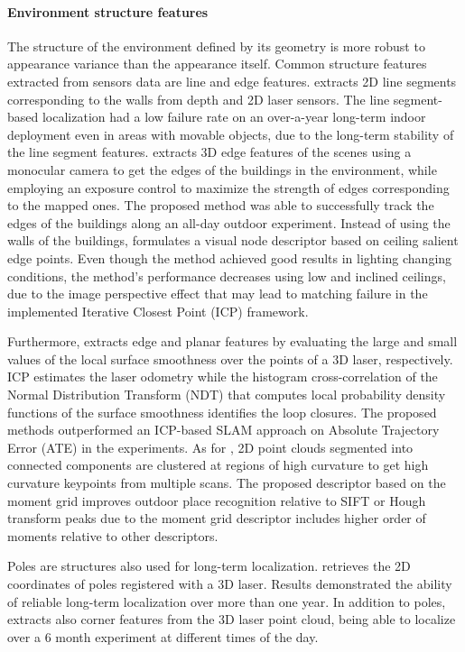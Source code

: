 \paragraph{Environment structure features}

The structure of the environment defined by its geometry is more robust to appearance variance than the appearance itself. Common structure features extracted from sensors data are line and edge features.
\cite{biswas-veloso:2013:0278364913503892} extracts 2D line segments corresponding to the walls from depth and 2D laser sensors. The line segment-based localization had a low failure rate on an over-a-year long-term indoor deployment even in areas with movable objects, due to the long-term stability of the line segment features.
\cite{nuske-et-al:2009:20306} extracts 3D edge features of the scenes using a monocular camera to get the edges of the buildings in the environment, while employing an exposure control to maximize the strength of edges corresponding to the mapped ones. The proposed method was able to successfully track the edges of the buildings along an all-day outdoor experiment.
Instead of using the walls of the buildings, \cite{an-et-al:2016:0} formulates a visual node descriptor based on ceiling salient edge points. Even though the method achieved good results in lighting changing conditions, the method's performance decreases using low and inclined ceilings, due to the image perspective effect that may lead to matching failure in the implemented Iterative Closest Point (ICP) framework.

Furthermore, \cite{meng-et-al:2021:3062647} extracts edge and planar features by evaluating the large and small values of the local surface smoothness over the points of a 3D laser, respectively. ICP estimates the laser odometry while the histogram cross-correlation of the Normal Distribution Transform (NDT) that computes local probability density functions of the surface smoothness identifies the loop closures.
The proposed methods outperformed an ICP-based SLAM approach on Absolute Trajectory Error (ATE) in the experiments.
As for \cite{bosse-zlot:2009:009}, 2D point clouds segmented into connected components are clustered at regions of high curvature to get high curvature keypoints from multiple scans.
The proposed descriptor based on the moment grid improves outdoor place recognition relative to SIFT or Hough transform peaks due to the moment grid descriptor includes higher order of moments relative to other descriptors.

Poles are structures also used for long-term localization.
\cite{schaefer-et-al:2021:103709} retrieves the 2D coordinates of poles registered with a 3D laser. Results demonstrated the ability of reliable long-term localization over more than one year.
In addition to poles, \cite{berrio-et-al:2019:8814289} extracts also corner features from the 3D laser point cloud, being able to localize over a 6 month experiment at different times of the day.

